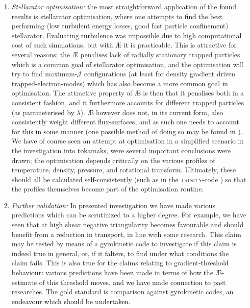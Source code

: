 \begin{enumerate}
    \item {\it Stellarator optimisation:} the most straightforward application of the found results is stellarator optimisation, where one attempts to find the best performing (low turbulent energy losses, good fast particle confinement) stellarator. Evaluating turbulence was impossible due to high computational cost of such simulations, but with \AE{} it is practicable. This is attractive for several reasons; the \AE{} penalises lack of radially stationary trapped particles which is a common goal of stellarator optimisation, and the optimisation will try to find maximum-$\mathcal{J}$ configurations (at least for density gradient driven trapped-electron-modes) which has also become a more common goal in optimisation. The attractive property of \AE{} is then that it penalises both in a consistent fashion, and it furthermore accounts for different trapped particles (as parameterised by $\lambda$). \AE{} however does not, in its current form, also consistently weight different flux-surfaces, and as such one needs to account for this in some manner (one possible method of doing so may be found in \citet{goodman2022constructing}). We have of course seen an attempt at optimisation in a simplified scenario in the investigation into tokamaks, were several important conclusions were drawn; the optimisation depends critically on the various profiles of temperature, density, pressure, and rotational transform. Ultimately, these should all be calculated self-consistently (such as in the \textsc{trinity}-code \cite{barnes2009trinity,barnes2010direct,highcock2014trinity,highcock2018optimisation}) so that the profiles themselves become part of the optimisation routine.
    \item {\it Further validation:} In presented investigation we have made various predictions which can be scrutinized to a higher degree. For example, we have seen that at high shear negative triangularity becomes favourable and should benefit from a reduction in transport, in line with some research. This claim may be tested by means of a gyrokinetic code to investigate if this claim is indeed true in general, or, if it falters, to find under what conditions the claim fails. This is also true for the claims relating to gradient-threshold behaviour: various predictions have been made in terms of how the \AE{}-estimate of this threshold moves, and we have made connection to past researches. The gold standard is comparison against gyrokinetic codes, an endeavour which should be undertaken.

\end{enumerate}
